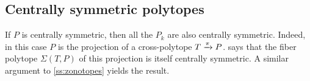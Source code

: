 \subsection{Centrally symmetric polytopes} \label{ss:centrally-symmetric}

If $P$ is centrally symmetric, then all the $P_k$ are also centrally symmetric.
Indeed, in this case $P$ is the projection of a cross-polytope $T \xrightarrow{\pi} P$.
\cite[Theorem 5.1]{BilleraSturmfels92} says that the fiber polytope $\Sigma(T,P)$ of this projection is itself centrally symmetric.
A similar argument to \cref{ss:zonotopes} yields the result.


